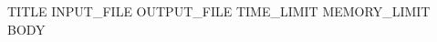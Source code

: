 \begin{problem}{ {{TITLE}} }{ {{INPUT_FILE}} }{ {{OUTPUT_FILE}} }{ {{TIME_LIMIT}} }{ {{MEMORY_LIMIT}} }
{{BODY}}
\end{problem}
